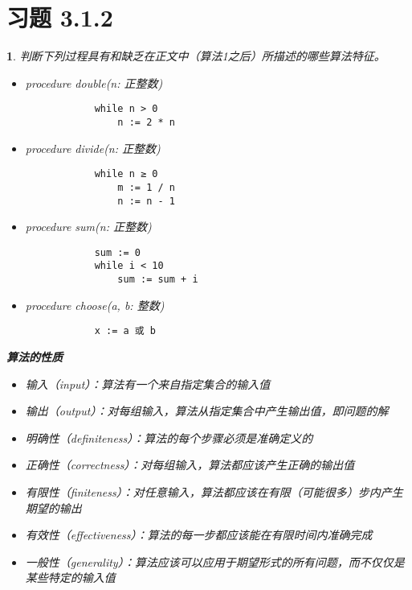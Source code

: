 \documentclass[UTF8]{report}
\theoremstyle{MyLineTheoremStyle} %
\theoremstyle{MyBlockTheoremStyle} %
\theoremstyle{MySubsubsectionStyle} %
\newtheorem{definition}{}
\begin{document}
\section{习题 3.1.2}
\begin{definition}
    判断下列过程具有和缺乏在正文中（算法1之后）所描述的哪些算法特征。
    \begin{itemize}
        \item[a)] procedure double(n: 正整数)
        \begin{verbatim}
            while n > 0
                n := 2 * n
        \end{verbatim}
        \item[b)] procedure divide(n: 正整数)
        \begin{verbatim}
            while n ≥ 0
                m := 1 / n
                n := n - 1
        \end{verbatim}
        \item[c)] procedure sum(n: 正整数)
        \begin{verbatim}
            sum := 0
            while i < 10
                sum := sum + i
        \end{verbatim}
        \item[d)] procedure choose(a, b: 整数)
        \begin{verbatim}
            x := a 或 b
        \end{verbatim}
    \end{itemize}
    \textbf{算法的性质}\par
    \begin{itemize}
        \item 输入（input）：算法有一个来自指定集合的输入值
        \item 输出（output）：对每组输入，算法从指定集合中产生输出值，即问题的解
        \item 明确性（definiteness）：算法的每个步骤必须是准确定义的
        \item 正确性（correctness）：对每组输入，算法都应该产生正确的输出值
        \item 有限性（finiteness）：对任意输入，算法都应该在有限（可能很多）步内产生期望的输出
        \item 有效性（effectiveness）：算法的每一步都应该能在有限时间内准确完成
        \item 一般性（generality）：算法应该可以应用于期望形式的所有问题，而不仅仅是某些特定的输入值
    \end{itemize}
\end{definition}
    
\end{document}
